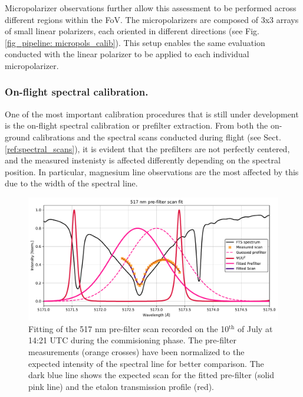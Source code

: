Micropolarizer observations further allow this assessment to be performed across different regions within the FoV. The micropolarizers are composed of 3x3 arrays of small linear polarizers, each oriented in different directions (see Fig. \ref{fig_pipeline: micropols_calib}). This setup enables the same evaluation conducted with the linear polarizer to be applied to each individual micropolarizer.


\subsubsection{\label{sect:pipeline_prefilter_scans_fit}On-flight spectral calibration.}

One of the most important calibration procedures that is still under development is the on-flight spectral calibration or prefilter extraction. From both the on-ground calibrations and the spectral scans conducted during flight (see Sect. \ref{ref:spectral_scans}), it is evident that the prefilters are not perfectly centered, and the measured instenisty is affected differently depending on the spectral position. In particular, magnesium line observations are the most affected by this due to the width of the spectral line.

\begin{figure}[t]
  \includegraphics[width=\textwidth]{figures/Pipeline/Prefilterfit.pdf}
  \caption[Prefilter fitting.]{
    Fitting of the 517 nm pre-filter scan recorded on the 10$^\text{th}$ of July at 14:21 UTC during the commisioning phase. The pre-filter measurements (orange crosses) have been normalized to the expected intensity of the spectral line for better comparison. The dark blue line shows the expected scan for the fitted pre-filter (solid pink line) and the etalon transmission profile (red).}
    \label{fig_pipeline: prefilter_fit}
\end{figure}


